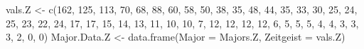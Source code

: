 \documentclass[
]{article}
\newenvironment{Shaded}{\begin{snugshade}}{\end{snugshade}}
\newcommand{\AttributeTok}[1]{\textcolor[rgb]{0.77,0.63,0.00}{#1}}
\newcommand{\DecValTok}[1]{\textcolor[rgb]{0.00,0.00,0.81}{#1}}
\newcommand{\FunctionTok}[1]{\textcolor[rgb]{0.00,0.00,0.00}{#1}}
\newcommand{\NormalTok}[1]{#1}
\newcommand{\OtherTok}[1]{\textcolor[rgb]{0.56,0.35,0.01}{#1}}
\begin{document}
\begin{Shaded}
\begin{Highlighting}[]
\NormalTok{vals.Z }\OtherTok{\textless{}{-}} \FunctionTok{c}\NormalTok{(}\DecValTok{162}\NormalTok{, }\DecValTok{125}\NormalTok{, }\DecValTok{113}\NormalTok{, }\DecValTok{70}\NormalTok{, }\DecValTok{68}\NormalTok{, }\DecValTok{88}\NormalTok{, }\DecValTok{60}\NormalTok{, }\DecValTok{58}\NormalTok{, }\DecValTok{50}\NormalTok{, }\DecValTok{38}\NormalTok{, }\DecValTok{35}\NormalTok{, }\DecValTok{48}\NormalTok{, }\DecValTok{44}\NormalTok{, }\DecValTok{35}\NormalTok{, }\DecValTok{33}\NormalTok{, }\DecValTok{30}\NormalTok{, }\DecValTok{25}\NormalTok{, }\DecValTok{24}\NormalTok{, }\DecValTok{25}\NormalTok{, }\DecValTok{23}\NormalTok{, }\DecValTok{22}\NormalTok{, }\DecValTok{24}\NormalTok{, }\DecValTok{17}\NormalTok{, }\DecValTok{17}\NormalTok{, }\DecValTok{15}\NormalTok{, }\DecValTok{14}\NormalTok{, }\DecValTok{13}\NormalTok{, }\DecValTok{11}\NormalTok{, }\DecValTok{10}\NormalTok{, }\DecValTok{10}\NormalTok{, }\DecValTok{7}\NormalTok{, }\DecValTok{12}\NormalTok{, }\DecValTok{12}\NormalTok{, }\DecValTok{12}\NormalTok{, }\DecValTok{12}\NormalTok{, }\DecValTok{6}\NormalTok{, }\DecValTok{5}\NormalTok{, }\DecValTok{5}\NormalTok{, }\DecValTok{5}\NormalTok{, }\DecValTok{4}\NormalTok{, }\DecValTok{4}\NormalTok{, }\DecValTok{3}\NormalTok{, }\DecValTok{3}\NormalTok{, }\DecValTok{3}\NormalTok{, }\DecValTok{2}\NormalTok{, }\DecValTok{0}\NormalTok{, }\DecValTok{0}\NormalTok{)}
\NormalTok{Major.Data.Z }\OtherTok{\textless{}{-}} \FunctionTok{data.frame}\NormalTok{(}\AttributeTok{Major =}\NormalTok{ Majors.Z,}
                         \AttributeTok{Zeitgeist =}\NormalTok{ vals.Z)}
    

\end{Highlighting}
\end{Shaded}
\end{document}
